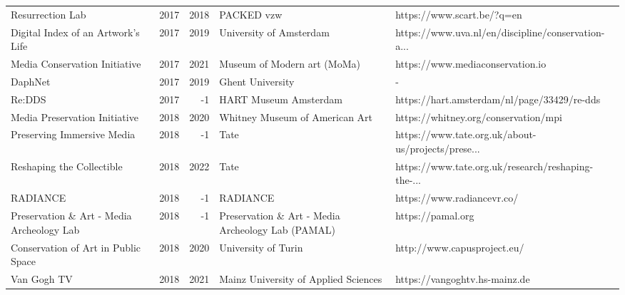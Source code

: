 \begin{table}[!h]
\begin{longtable}{lrrll}
                                  Resurrection Lab &      2017 & 2018 &                                         PACKED vzw &                         https://www.scart.be/?q=en \\
                Digital Index of an Artwork's Life &      2017 & 2019 &                            University of Amsterdam & https://www.uva.nl/en/discipline/conservation-a... \\
                     Media Conservation Initiative &      2017 & 2021 &                        Museum of Modern art (MoMa) &                   https://www.mediaconservation.io \\
                                           DaphNet &      2017 & 2019 &                                  Ghent University  &                                                  - \\
                                            Re:DDS &      2017 &   -1 &                              HART Museum Amsterdam &        https://hart.amsterdam/nl/page/33429/re-dds \\
                     Media Preservation Initiative &      2018 & 2020 &                     Whitney Museum of American Art &               https://whitney.org/conservation/mpi \\
                        Preserving Immersive Media &      2018 &   -1 &                                               Tate & https://www.tate.org.uk/about-us/projects/prese... \\
                         Reshaping the Collectible &      2018 & 2022 &                                               Tate & https://www.tate.org.uk/research/reshaping-the-... \\
                                          RADIANCE &      2018 &   -1 &                                           RADIANCE &                        https://www.radiancevr.co/  \\
         Preservation \& Art - Media Archeology Lab &      2018 &   -1 &  Preservation \& Art - Media Archeology Lab (PAMAL) &                                 https://pamal.org  \\
               Conservation of Art in Public Space &      2018 & 2020 &                                University of Turin &                        http://www.capusproject.eu/ \\
                                       Van Gogh TV &      2018 & 2021 &               Mainz University of Applied Sciences &                      https://vangoghtv.hs-mainz.de \\

\end{longtable}
\end{table}
